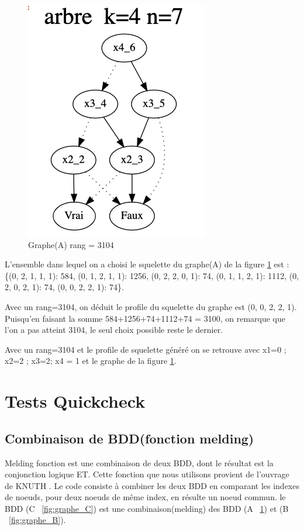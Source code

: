 \documentclass[french]{article}
\begin{document}
\begin{figure}[h!]
    \centering
    \includegraphics[scale=0.4]{arb_3104.png}
    \caption{Graphe(A) rang = 3104}
    \label{fig:graphe_A}
\end{figure}
L'ensemble dans lequel on a choisi le squelette du graphe(A) de la figure \ref{fig:graphe_A} est : \{(0, 2, 1, 1, 1): 584, (0, 1, 2, 1, 1): 1256, (0, 2, 2, 0, 1): 74, (0, 1, 1, 2, 1): 1112, (0, 2, 0, 2, 1): 74, (0, 0, 2, 2, 1): 74\}.

Avec un rang=3104, on déduit le profile du squelette du graphe est (0, 0, 2, 2, 1). Puisqu'en faisant la somme 584+1256+74+1112+74 = 3100, on remarque que l'on a pas atteint 3104, le seul choix possible reste le dernier.

Avec un rang=3104 et le profile de squelette généré on se retrouve avec {x1=0 ; x2=2  ; x3=2; x4 = 1} et le graphe de la figure \ref{fig:graphe_A}.

\section{Tests Quickcheck}

\subsection{Combinaison de BDD(fonction melding)}
Melding fonction est une combinaison de deux BDD, dont le résultat est la conjonction logique ET. Cette fonction que nous utilisons provient de l'ouvrage de KNUTH \cite{knuth}. Le code consiste à combiner les deux BDD en comparant les indexes de noeuds, pour deux noeuds de même index, en résulte un noeud commun. le BDD 
(C ~\ref{fig:graphe_C}) est une combinaison(melding) des BDD (A ~\ref{fig:graphe_A}) et (B ~\ref{fig:graphe_B}).
\end{document}
